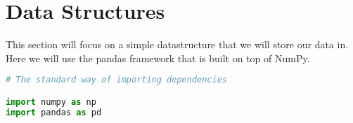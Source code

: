 \documentclass[12pt, letterpaper]{article}
\begin{document}
\section{Data Structures}
This section will focus on a simple datastructure that we will store our data in. Here we will use the pandas framework that is built on top of NumPy.

\begin{lstlisting}[language=python]
# The standard way of importing dependencies

import numpy as np
import pandas as pd




\end{lstlisting}
\end{document}
